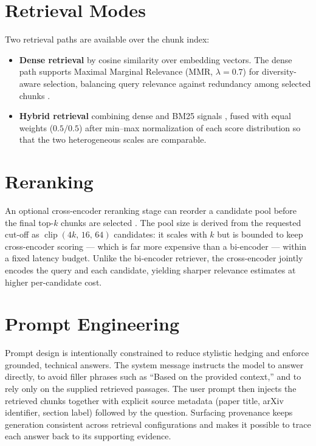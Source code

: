 \documentclass[12pt,a4paper,titlepage,oneside]{book}
\begin{document}
\section{Retrieval Modes}
Two retrieval paths are available over the chunk index:
\begin{itemize}
    \item \textbf{Dense retrieval} by cosine similarity over embedding vectors. The dense path supports Maximal Marginal Relevance (MMR, $\lambda=0.7$) for diversity-aware selection, balancing query relevance against redundancy among selected chunks \cite{carbonell1998mmr}.
    \item \textbf{Hybrid retrieval} combining dense and BM25 signals \cite{robertson2009bm25}, fused with equal weights ($0.5/0.5$) after min--max normalization of each score distribution so that the two heterogeneous scales are comparable.
\end{itemize}

\section{Reranking}
An optional cross-encoder reranking stage can reorder a candidate pool before the final top-$k$ chunks are selected \cite{nogueira2019bert}. The pool size is derived from the requested cut-off as $\operatorname{clip}(4k,\,16,\,64)$ candidates: it scales with $k$ but is bounded to keep cross-encoder scoring — which is far more expensive than a bi-encoder — within a fixed latency budget. Unlike the bi-encoder retriever, the cross-encoder jointly encodes the query and each candidate, yielding sharper relevance estimates at higher per-candidate cost.

\section{Prompt Engineering}
Prompt design is intentionally constrained to reduce stylistic hedging and enforce grounded, technical answers. The system message instructs the model to answer directly, to avoid filler phrases such as ``Based on the provided context,'' and to rely only on the supplied retrieved passages. The user prompt then injects the retrieved chunks together with explicit source metadata (paper title, arXiv identifier, section label) followed by the question. Surfacing provenance keeps generation consistent across retrieval configurations and makes it possible to trace each answer back to its supporting evidence.
\end{document}
